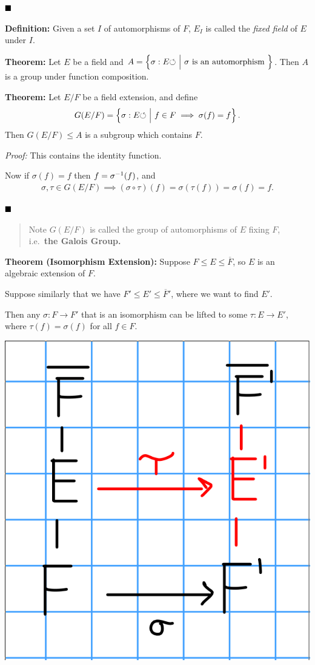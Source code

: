 \(\qed\)

\textbf{Definition:} Given a set \(I\) of automorphisms of \(F\),
\(E_I\) is called the \emph{fixed field} of \(E\) under \(I\).

\textbf{Theorem:} Let \(E\) be a field and
\(A = \left\{{\sigma:E {\circlearrowleft} {~\mathrel{\Big|}~} \sigma\text{ is an automorphism }}\right\}\).
Then \(A\) is a group under function composition.

\textbf{Theorem:} Let \(E/F\) be a field extension, and define
\begin{align*}
G(E/F) = \left\{{\sigma:E{\circlearrowleft} {~\mathrel{\Big|}~} f\in F \implies \sigma(f) = f}\right\}
.\end{align*} Then \(G(E/F) \leq A\) is a subgroup which contains \(F\).

\emph{Proof:} This contains the identity function.

Now if \(\sigma(f) = f\) then \(f = \sigma^{-1}(f)\), and
\begin{align*}
\sigma, \tau \in G(E/F) \implies (\sigma \circ \tau)(f) = \sigma(\tau(f)) = \sigma(f) = f
.\end{align*}

\(\qed\)

\begin{quote}
Note \(G(E/F)\) is called the group of automorphisms of \(E\) fixing
\(F\), i.e.~\textbf{the Galois Group.}
\end{quote}

\textbf{Theorem (Isomorphism Extension):} Suppose
\(F \leq E \leq \overline F\), so \(E\) is an algebraic extension of
\(F\).

Suppose similarly that we have \(F' \leq E' \leq \overline F'\), where
we want to find \(E'\).

Then any \(\sigma: F \to F'\) that is an isomorphism can be lifted to
some \(\tau: E \to E'\), where \(\tau(f) = \sigma(f)\) for all
\(f\in F\).

\includegraphics{figures/2019-09-29-19:10.png}\\

